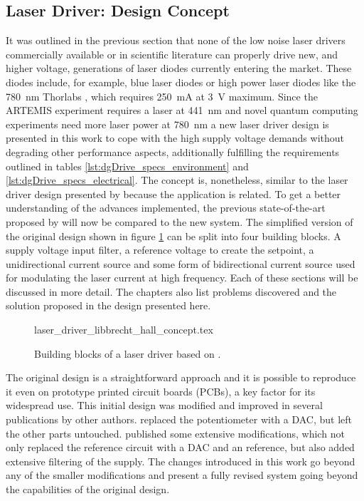 \subsection{Laser Driver: Design Concept}
It was outlined in the previous section that none of the low noise laser drivers commercially available or in scientific literature can properly drive new, and higher voltage, generations of laser diodes currently entering the market. These diodes include, for example, blue laser diodes or high power laser diodes like the \qty{780}{\nm} Thorlabs , which requires \qty{250}{\mA} at \qty{3}{\V} maximum. Since the ARTEMIS experiment requires a laser at \qty{441}{\nm} and novel quantum computing experiments need more laser power at \qty{780}{\nm}  a new laser driver design is presented in this work to cope with the high supply voltage demands without degrading other performance aspects, additionally fulfilling the requirements outlined in tables \ref{lst:dgDrive_specs_environment} and \ref{lst:dgDrive_specs_electrical}. The concept is, nonetheless, similar to the laser driver design presented by \citeauthor{libbrecht_hall} \cite{libbrecht_hall} because the application is related. To get a better understanding of the advances implemented, the previous state-of-the-art proposed by \citeauthor{libbrecht_hall} will now be compared to the new system. The simplified version of the original design shown in figure \ref{fig:laser_driver_libbrecht_hall_concept} can be split into four building blocks. A supply voltage input filter, a reference voltage to create the setpoint, a unidirectional current source and some form of bidirectional current source used for modulating the laser current at high frequency. Each of these sections will be discussed in more detail. The chapters also list problems discovered and the solution proposed in the design presented here.
\begin{figure}[ht]
    \centering
        {laser_driver_libbrecht_hall_concept.tex}
    \caption{Building blocks of a laser driver based on \cite{libbrecht_hall}.}
    \label{fig:laser_driver_libbrecht_hall_concept}
\end{figure}

The original design is a straightforward approach and it is possible to reproduce it even on prototype printed circuit boards (PCBs), a key factor for its widespread use. This initial design was modified and improved in several publications by other authors. \citeauthor{laser_driver_digital} \cite{laser_driver_digital} replaced the potentiometer with a DAC, but left the other parts untouched. \citeauthor{laser_driver_qcl_taubman} \cite{laser_driver_qcl_taubman,laser_driver_qcl_taubman_multiplexer} published some extensive modifications, which not only replaced the reference circuit with a DAC and an  reference, but also added extensive filtering of the supply. The changes introduced in this work go beyond any of the smaller modifications and present a fully revised system going beyond the capabilities of the original design.

